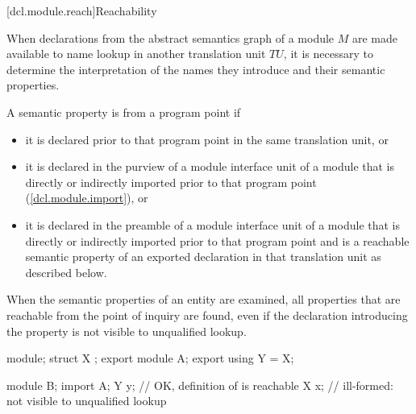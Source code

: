 [dcl.module.reach]{Reachability}

\begin{std.txt}\color{addclr}
  \resetalinea[0]
  \alinea
  When declarations from the abstract semantics graph of a module $M$
   are made available 
  to name lookup in another translation unit $TU$, it is necessary to
  determine the interpretation of the names they introduce and their
  semantic properties.
\begin{after}\color{addclr}
  \alinea
  A semantic property is  from a program point if
  \begin{itemize}\color{addclr}
  \item it is declared prior to that program point in the same translation unit, or
  \item it is declared in the purview of a module interface unit of a module
  that is directly or indirectly imported prior to that program point (\ref{dcl.module.import}), or
  \item it is declared in the preamble of a module interface unit of a module
  that is directly
  or indirectly imported prior to that program point
  and is a reachable semantic property of an exported declaration
  in that translation unit as described below.
  \end{itemize}
  When the semantic properties of an entity are examined,
  all properties that are reachable from
  the point of inquiry are found,
  even if the declaration introducing the property
  is not visible to unqualified lookup.
\begin{example}
\begin{codeblock}
module;
struct X {};
export module A;
export using Y = X;

module B;
import A;
Y y;            // OK, definition of  is reachable
X x;            // ill-formed:  not visible to unqualified lookup
\end{codeblock}
\end{example}
\end{after}


\end{std.txt}
